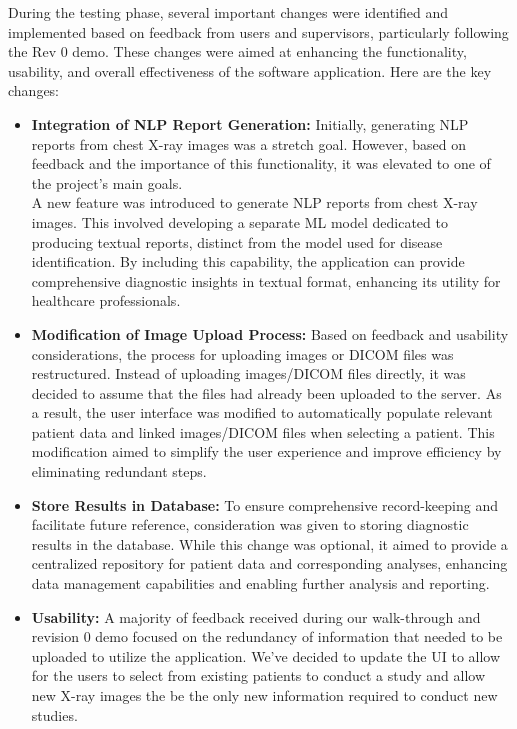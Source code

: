 \documentclass[12pt, titlepage]{article}
\begin{document}
During the testing phase, several important changes were identified and implemented based on feedback from users and supervisors, particularly following the Rev 0 demo. These changes were aimed at enhancing the functionality, usability, and overall effectiveness of the software application. Here are the key changes:
\begin{itemize}
    \item \textbf{Integration of NLP Report Generation:}  Initially, generating NLP reports from chest X-ray images was a stretch goal. However, based on feedback and the importance of this functionality, it was elevated to one of the project's main goals. \\
    A new feature was introduced to generate NLP reports from chest X-ray images. This involved developing a separate ML model dedicated to producing textual reports, distinct from the model used for disease identification. By including this capability, the application can provide comprehensive diagnostic insights in textual format, enhancing its utility for healthcare professionals.
    \item \textbf{Modification of Image Upload Process:} Based on feedback and usability considerations, the process for uploading images or DICOM files was restructured. Instead of uploading images/DICOM files directly, it was decided to assume that the files had already been uploaded to the server. As a result, the user interface was modified to automatically populate relevant patient data and linked images/DICOM files when selecting a patient. This modification aimed to simplify the user experience and improve efficiency by eliminating redundant steps.
    \item \textbf{Store Results in Database:} To ensure comprehensive record-keeping and facilitate future reference, consideration was given to storing diagnostic results in the database. While this change was optional, it aimed to provide a centralized repository for patient data and corresponding analyses, enhancing data management capabilities and enabling further analysis and reporting.
    \item \textbf{Usability:} A majority of feedback received during our walk-through and revision 0 demo focused on the redundancy of information that needed to be uploaded to utilize the application. We've decided to update the UI to allow for the users to select from existing patients to conduct a study and allow new X-ray images the be the only new information required to conduct new studies. 
\end{itemize}
\end{document}
